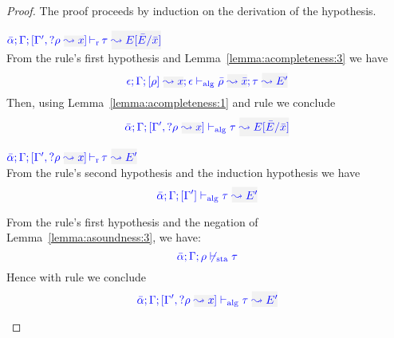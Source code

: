 \begin{proof}
The proof proceeds by induction on the derivation of the hypothesis.
\begin{description}
\setlength{\itemsep}{1em}
\item[\fbox{\rref{L-RuleMatch}}]\quad
$\dlres{\bar\alpha}{\tenv}{\tenv',\envi{\rulet}{x}}{\type}{E[\bar{E}/\bar{x}]}$\ \\

From the rule's first hypothesis and Lemma~\ref{lemma:acompleteness:3} we have
\begin{equation*}
  \admres{\epsilon}{\tenv}{\rulet}{x}{\epsilon}{\type}{E'}{\ie{\bar\rulet}{\bar{x}}}
\end{equation*}
Then, using Lemma~\ref{lemma:acompleteness:1} and rule  we conclude
\begin{equation*}
  \adlres{\bar\alpha}{\tenv}{\tenv',\envi{\rulet}{x}}{\type}{E[\bar{E}/\bar{x}]}
\end{equation*}

\item[\fbox{\rref{L-RuleNoMatch}}]\quad
$\dlres{\bar\alpha}{\tenv}{\tenv',\envi{\rulet}{x}}{\type}{E'}$\ \\

  From the rule's second hypothesis and the induction hypothesis we have
\begin{equation*}
  \adlres{\bar\alpha}{\tenv}{\tenv'}{\type}{E'}
\end{equation*}

  From the rule's first hypothesis and the negation of Lemma~\ref{lemma:asoundness:3}, we have:
\begin{equation*}
{\color{blue} \bar\alpha; \Gamma; \rho\not\vdash_{\mathrm{sta}}\tau}
\end{equation*}
  Hence with rule  we conclude
\begin{equation*}
  \adlres{\bar\alpha}{\tenv}{\tenv',\envi{\rulet}{x}}{\type}{E'}
\end{equation*}


\end{description}
\end{proof}
